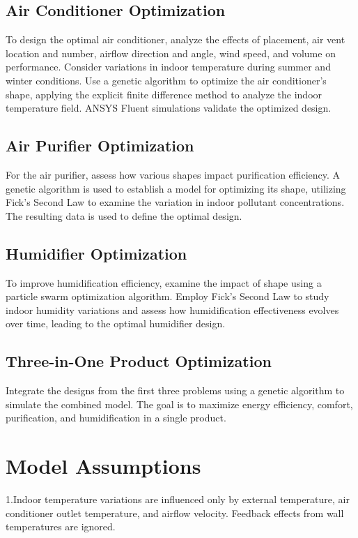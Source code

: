 \documentclass{apmcmthesis}
\begin{document}
\subsection{ Air Conditioner Optimization}
To design the optimal air conditioner, analyze the effects of placement, air vent location and number, airflow direction and angle, wind speed, and volume on performance. Consider variations in indoor temperature during summer and winter conditions. Use a genetic algorithm to optimize the air conditioner's shape, applying the explicit finite difference method to analyze the indoor temperature field. ANSYS Fluent simulations validate the optimized design.


\subsection{Air Purifier Optimization}
For the air purifier, assess how various shapes impact purification efficiency. A genetic algorithm is used to establish a model for optimizing its shape, utilizing Fick's Second Law to examine the variation in indoor pollutant concentrations. The resulting data is used to define the optimal design.

\subsection{Humidifier Optimization}
To improve humidification efficiency, examine the impact of shape using a particle swarm optimization algorithm. Employ Fick's Second Law to study indoor humidity variations and assess how humidification effectiveness evolves over time, leading to the optimal humidifier design.




\subsection{Three-in-One Product Optimization}
Integrate the designs from the first three problems using a genetic algorithm to simulate the combined model. The goal is to maximize energy efficiency, comfort, purification, and humidification in a single product.


\section{Model Assumptions}

1.Indoor temperature variations are influenced only by external temperature, air conditioner outlet temperature, and airflow velocity. Feedback effects from wall temperatures are ignored.\\
\end{document}
